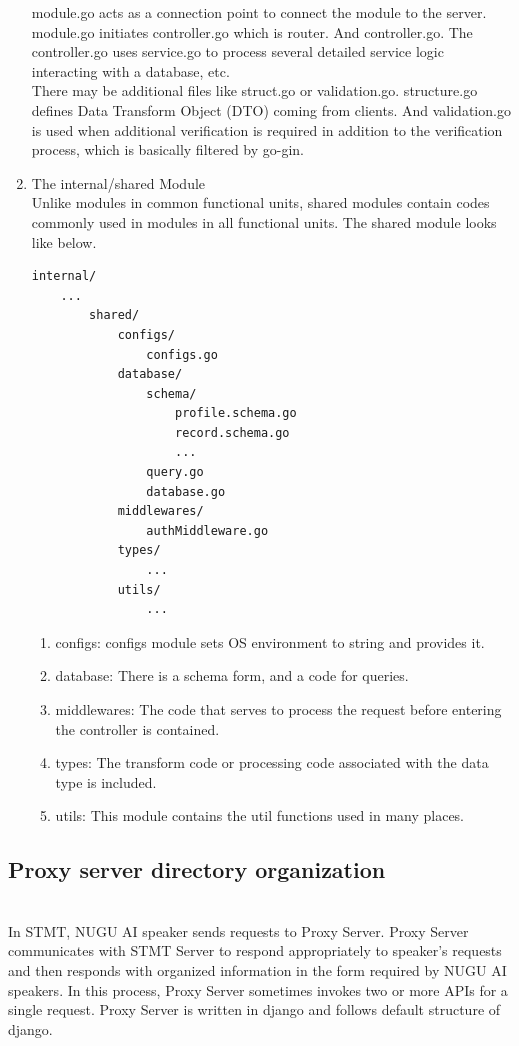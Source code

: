 \documentclass[conference]{IEEEtran}
\begin{document}
\begin{enumerate}
    module.go acts as a connection point to connect the module to the server. module.go initiates controller.go which is router. And controller.go. The controller.go uses service.go to process several detailed service logic interacting with a database, etc. \\
    There may be additional files like struct.go or validation.go. structure.go defines Data Transform Object (DTO) coming from clients. And validation.go is used when additional verification is required in addition to the verification process, which is basically filtered by go-gin. \\
    
\item The internal/shared Module \\
Unlike modules in common functional units, shared modules contain codes commonly used in modules in all functional units. The shared module looks like below. \\
    
    \begin{lstlisting}[frame=single]
    internal/
    ...
        shared/
            configs/
                configs.go
            database/
                schema/
                    profile.schema.go
                    record.schema.go
                    ...
                query.go
                database.go
            middlewares/
                authMiddleware.go
            types/
                ...
            utils/
                ...
    \end{lstlisting}
        \begin{enumerate}
            \item configs: configs module sets OS environment to string and provides it.
            \item database: There is a schema form, and a code for queries.
            \item middlewares: The code that serves to process the request before entering the controller is contained.
            \item types: The transform code or processing code associated with the data type is included.
            \item utils: This module contains the util functions used in many places. \\
        \end{enumerate}
    \end{enumerate}
            
\subsection{Proxy server directory organization} \\ 
In STMT, NUGU AI speaker sends requests to Proxy Server. Proxy Server communicates with STMT Server to respond appropriately to speaker's requests and then responds with organized information in the form required by NUGU AI speakers. In this process, Proxy Server sometimes invokes two or more APIs for a single request. Proxy Server is written in django and follows default structure of django.\\
\end{document}
